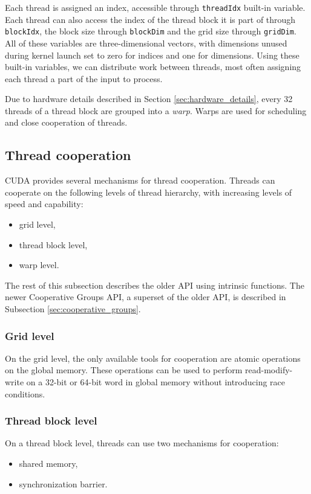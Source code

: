 Each thread is assigned an index, accessible through \texttt{threadIdx} built-in variable. Each thread can also access the index of the thread block it is part of through \texttt{blockIdx}, the block size through \texttt{blockDim} and the grid size through \texttt{gridDim}. All of these variables are three-dimensional vectors, with dimensions unused during kernel launch set to zero for indices and one for dimensions. Using these built-in variables, we can distribute work between threads, most often assigning each thread a part of the input to process.

Due to hardware details described in Section \ref{sec:hardware_details}, every 32 threads of a thread block are grouped into a \textit{warp}. Warps are used for scheduling and close cooperation of threads. 

\subsection{Thread cooperation}
\label{sec:thread_cooperation}
CUDA provides several mechanisms for thread cooperation. Threads can cooperate on the following levels of thread hierarchy, with increasing levels of speed and capability:

\begin{itemize}
	\item grid level,
	\item thread block level,
	\item warp level.
\end{itemize}

The rest of this subsection describes the older API using intrinsic functions. The newer Cooperative Groups API, a superset of the older API, is described in Subsection \ref{sec:cooperative_groups}.

\subsubsection{Grid level}
On the grid level, the only available tools for cooperation are atomic operations on the global memory. These operations can be used to perform read-modify-write on a 32-bit or 64-bit word in global memory without introducing race conditions.

\subsubsection{Thread block level}
On a thread block level, threads can use two mechanisms for cooperation:
\begin{itemize}
	\item shared memory,
	\item synchronization barrier.
\end{itemize}

